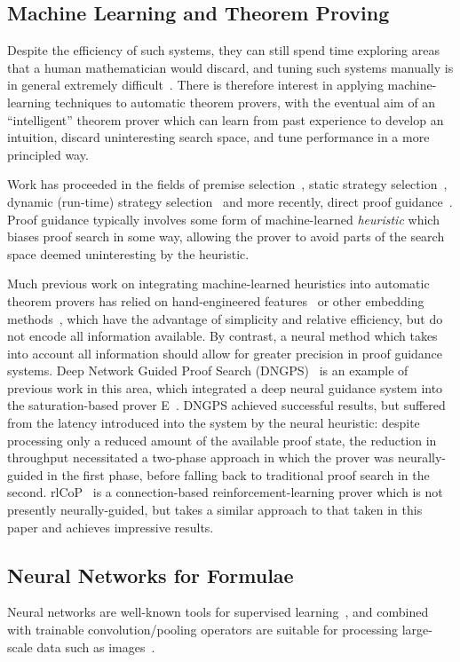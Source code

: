 \documentclass[runningheads]{llncs}
\begin{document}
\subsection{Machine Learning and Theorem Proving}
Despite the efficiency of such systems, they can still spend time exploring areas that a human mathematician would discard, and tuning such systems manually is in general extremely difficult~\cite{portfolio}.
There is therefore interest in applying machine-learning techniques to automatic theorem provers, with the eventual aim of an ``intelligent'' theorem prover which can learn from past experience to develop an intuition, discard uninteresting search space, and tune performance in a more principled way.

Work has proceeded in the fields of premise selection~\cite{DeepMath,MaSh,MaLARea,formula-graph}, static strategy selection~\cite{Bridge,MaLeS,E-MaLeS}, dynamic (run-time) strategy selection~\cite{dynamic-strategy-priority} and more recently, direct proof guidance~\cite{MaLeCoP,FEMaLeCoP,rlCoP,ENIGMA,DNGPS}.
Proof guidance typically involves some form of machine-learned \emph{heuristic} which biases proof search in some way, allowing the prover to avoid parts of the search space deemed uninteresting by the heuristic.

Much previous work on integrating machine-learned heuristics into automatic theorem provers has relied on hand-engineered features~\cite{MaLeCoP,FEMaLeCoP,rlCoP} or other embedding methods~\cite{ENIGMA}, which have the advantage of simplicity and relative efficiency, but do not encode all information available.
By contrast, a neural method which takes into account all information should allow for greater precision in proof guidance systems.
Deep Network Guided Proof Search (DNGPS)~\cite{DNGPS} is an example of previous work in this area, which integrated a deep neural guidance system into the saturation-based prover E~\cite{E}.
DNGPS achieved successful results, but suffered from the latency introduced into the system by the neural heuristic: despite processing only a reduced amount of the available proof state, the reduction in throughput necessitated a two-phase approach in which the prover was neurally-guided in the first phase, before falling back to traditional proof search in the second.
rlCoP~\cite{rlCoP} is a connection-based reinforcement-learning prover which is not presently neurally-guided, but takes a similar approach to that taken in this paper and achieves impressive results.

\subsection{Neural Networks for Formulae}
Neural networks are well-known tools for supervised learning~\cite{neural-survey}, and combined with trainable convolution/pooling operators are suitable for processing large-scale data such as images~\cite{cnn}.
\end{document}
